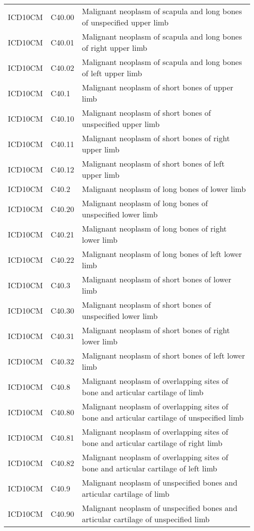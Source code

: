 \begin{table}[ht]
\begin{tabular}{lll}
  ICD10CM & C40.00 & Malignant neoplasm of scapula and long bones of unspecified upper limb \\ 
  ICD10CM & C40.01 & Malignant neoplasm of scapula and long bones of right upper limb \\ 
  ICD10CM & C40.02 & Malignant neoplasm of scapula and long bones of left upper limb \\ 
  ICD10CM & C40.1 & Malignant neoplasm of short bones of upper limb \\ 
  ICD10CM & C40.10 & Malignant neoplasm of short bones of unspecified upper limb \\ 
  ICD10CM & C40.11 & Malignant neoplasm of short bones of right upper limb \\ 
  ICD10CM & C40.12 & Malignant neoplasm of short bones of left upper limb \\ 
  ICD10CM & C40.2 & Malignant neoplasm of long bones of lower limb \\ 
  ICD10CM & C40.20 & Malignant neoplasm of long bones of unspecified lower limb \\ 
  ICD10CM & C40.21 & Malignant neoplasm of long bones of right lower limb \\ 
  ICD10CM & C40.22 & Malignant neoplasm of long bones of left lower limb \\ 
  ICD10CM & C40.3 & Malignant neoplasm of short bones of lower limb \\ 
  ICD10CM & C40.30 & Malignant neoplasm of short bones of unspecified lower limb \\ 
  ICD10CM & C40.31 & Malignant neoplasm of short bones of right lower limb \\ 
  ICD10CM & C40.32 & Malignant neoplasm of short bones of left lower limb \\ 
  ICD10CM & C40.8 & Malignant neoplasm of overlapping sites of bone and articular cartilage of limb \\ 
  ICD10CM & C40.80 & Malignant neoplasm of overlapping sites of bone and articular cartilage of unspecified limb \\ 
  ICD10CM & C40.81 & Malignant neoplasm of overlapping sites of bone and articular cartilage of right limb \\ 
  ICD10CM & C40.82 & Malignant neoplasm of overlapping sites of bone and articular cartilage of left limb \\ 
  ICD10CM & C40.9 & Malignant neoplasm of unspecified bones and articular cartilage of limb \\ 
  ICD10CM & C40.90 & Malignant neoplasm of unspecified bones and articular cartilage of unspecified limb \\ 

\end{tabular}
\end{table}
